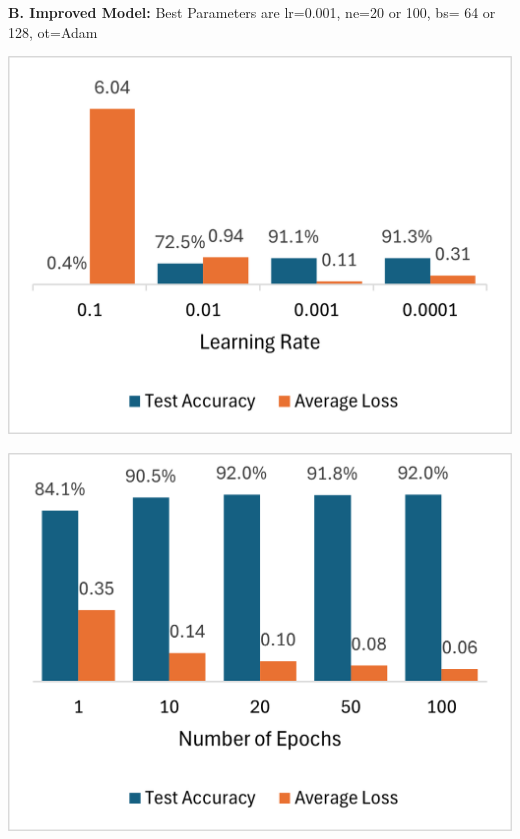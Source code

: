 \documentclass{article}
\begin{document}
\textbf{B. Improved Model: } Best Parameters are lr=0.001, ne=20 or 100, bs= 64 or 128, ot=Adam
\begin{center} %
    \begin{minipage}{0.3\textwidth}
        \centering
        \includegraphics[width=\textwidth]{figure/lr_improved.png}
    \end{minipage}
    \begin{minipage}{0.3\textwidth}
        \centering
        \includegraphics[width=\textwidth]{figure/epoch_improved.png}
    \end{minipage}
    \begin{minipage}{0.3\textwidth}
        \centering

\end{minipage}
\end{center}
\end{document}
